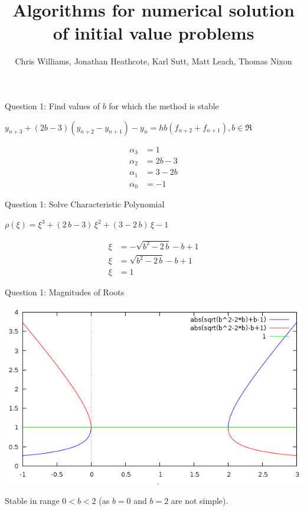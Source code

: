 \documentclass{beamer}
\title{Algorithms for numerical solution of initial value problems}
\author{Chris Williams, Jonathan Heathcote, Karl Sutt, Matt Leach, Thomas Nixon}
\begin{document}
\begin{frame}
	\titlepage
\end{frame}

\begin{frame}{Question 1: Find values of $b$ for which the method is stable}
	
	\vspace{\baselineskip}
	
	$y_{n+3} + (2b - 3)(y_{n+2} - y_{n+1}) - y_n = hb(f_{n+2} + f_{n+1}), b \in \Re$
	
	\vspace{\baselineskip}
	
	\begin{align*}
		\alpha_3 &= 1 \\
		\alpha_2 &= 2b - 3 \\
		\alpha_1 &= 3 - 2b \\
		\alpha_0 &= -1
	\end{align*}
\end{frame}

\begin{frame}{Question 1: Solve Characteristic Polynomial}
	
	\vspace{\baselineskip}
	
	$\rho(\xi) = \xi^3+\left(2\,b-3\right)\,\xi^2+\left(3-2\,b\right)\,\xi-1$
	
	\vspace{\baselineskip}
	
	\begin{align*}
		\xi&=-\sqrt{b^2-2\,b}-b+1 \\
		\xi&=\sqrt{b^2-2\,b}-b+1 \\
		\xi&=1
	\end{align*}
\end{frame}

\begin{frame}{Question 1: Magnitudes of Roots}
	\begin{center}
		\includegraphics[width=\textwidth]{rootMag.png}
	\end{center}
	
	Stable in range $0 < b < 2$ (as $b = 0$ and $b = 2$ are not simple).
\end{frame}
\end{document}
